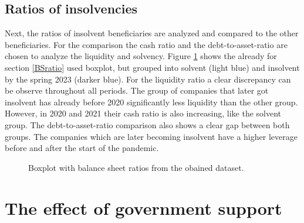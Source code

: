 \subsection{Ratios of insolvencies}

Next, the ratios of insolvent beneficiaries are analyzed and compared to the other beneficiaries. For the comparison the cash ratio and the debt-to-asset-ratio are chosen to analyze the liquidity and solvency. Figure \ref{fig:RatiosInsolvency} shows the already for section \ref{BSratio} used boxplot, but grouped into solvent (light blue) and insolvent by the spring 2023 (darker blue). For the liquidity ratio a clear discrepancy can be observe throughout all periods. The group of companies that later got insolvent has already before 2020 significantly less liquidity than the other group. However, in 2020 and 2021 their cash ratio is also increasing, like the solvent group.
The debt-to-asset-ratio comparison also shows a clear gap between both groups. The companies which are later becoming insolvent have a higher leverage before and after the start of the pandemic. 

\begin{figure}
    \centering
    
    \decoRule
    \caption[Balance sheet ratios]{Boxplot with balance sheet ratios from the obained dataset.}
    \label{fig:RatiosInsolvency}
\end{figure}






\section{The effect of government support}




